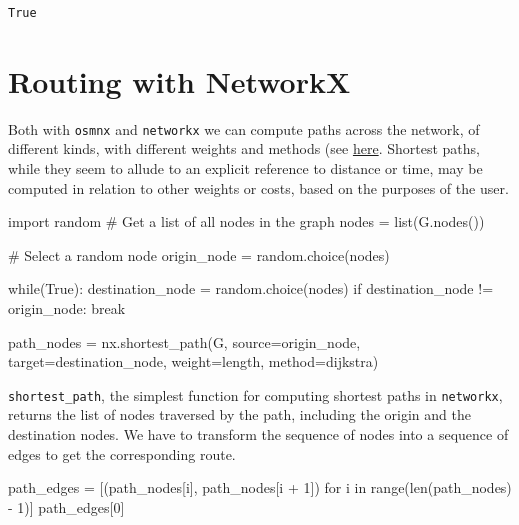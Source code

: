\documentclass[
  letterpaper,
  DIV=11,
  numbers=noendperiod]{scrreprt}
\newenvironment{Shaded}{\begin{snugshade}}{\end{snugshade}}
\newcommand{\BuiltInTok}[1]{\textcolor[rgb]{0.00,0.23,0.31}{#1}}
\newcommand{\CommentTok}[1]{\textcolor[rgb]{0.37,0.37,0.37}{#1}}
\newcommand{\ControlFlowTok}[1]{\textcolor[rgb]{0.00,0.23,0.31}{#1}}
\newcommand{\DecValTok}[1]{\textcolor[rgb]{0.68,0.00,0.00}{#1}}
\newcommand{\ImportTok}[1]{\textcolor[rgb]{0.00,0.46,0.62}{#1}}
\newcommand{\KeywordTok}[1]{\textcolor[rgb]{0.00,0.23,0.31}{#1}}
\newcommand{\NormalTok}[1]{\textcolor[rgb]{0.00,0.23,0.31}{#1}}
\newcommand{\OperatorTok}[1]{\textcolor[rgb]{0.37,0.37,0.37}{#1}}
\newcommand{\StringTok}[1]{\textcolor[rgb]{0.13,0.47,0.30}{#1}}
\newcommand{\VariableTok}[1]{\textcolor[rgb]{0.07,0.07,0.07}{#1}}
\begin{document}
\begin{verbatim}
True
\end{verbatim}

\hypertarget{routing-with-networkx}{%
\section{Routing with NetworkX}\label{routing-with-networkx}}

Both with \texttt{osmnx} and \texttt{networkx} we can compute paths
across the network, of different kinds, with different weights and
methods (see
\href{https://networkx.org/documentation/stable/reference/algorithms/shortest_paths.html}{here}.
Shortest paths, while they seem to allude to an explicit reference to
distance or time, may be computed in relation to other weights or costs,
based on the purposes of the user.

\begin{Shaded}
\begin{Highlighting}[]
\ImportTok{import}\NormalTok{ random}
\CommentTok{\# Get a list of all nodes in the graph}
\NormalTok{nodes }\OperatorTok{=} \BuiltInTok{list}\NormalTok{(G.nodes())}

\CommentTok{\# Select a random node}
\NormalTok{origin\_node }\OperatorTok{=}\NormalTok{ random.choice(nodes)}

\ControlFlowTok{while}\NormalTok{(}\VariableTok{True}\NormalTok{):}
\NormalTok{    destination\_node }\OperatorTok{=}\NormalTok{ random.choice(nodes)}
    \ControlFlowTok{if}\NormalTok{ destination\_node }\OperatorTok{!=}\NormalTok{ origin\_node:}
        \ControlFlowTok{break}

\NormalTok{path\_nodes }\OperatorTok{=}\NormalTok{ nx.shortest\_path(G, source}\OperatorTok{=}\NormalTok{origin\_node, target}\OperatorTok{=}\NormalTok{destination\_node, weight}\OperatorTok{=}\StringTok{\textquotesingle{}length\textquotesingle{}}\NormalTok{, method}\OperatorTok{=}\StringTok{\textquotesingle{}dijkstra\textquotesingle{}}\NormalTok{)}
\end{Highlighting}
\end{Shaded}

\texttt{shortest\_path}, the simplest function for computing shortest
paths in \texttt{networkx}, returns the list of nodes traversed by the
path, including the origin and the destination nodes. We have to
transform the sequence of nodes into a sequence of edges to get the
corresponding route.

\begin{Shaded}
\begin{Highlighting}[]
\NormalTok{path\_edges }\OperatorTok{=}\NormalTok{ [(path\_nodes[i], path\_nodes[i }\OperatorTok{+} \DecValTok{1}\NormalTok{]) }\ControlFlowTok{for}\NormalTok{ i }\KeywordTok{in} \BuiltInTok{range}\NormalTok{(}\BuiltInTok{len}\NormalTok{(path\_nodes) }\OperatorTok{{-}} \DecValTok{1}\NormalTok{)] }
\NormalTok{path\_edges[}\DecValTok{0}\NormalTok{]}
\end{Highlighting}
\end{Shaded}
\end{document}

